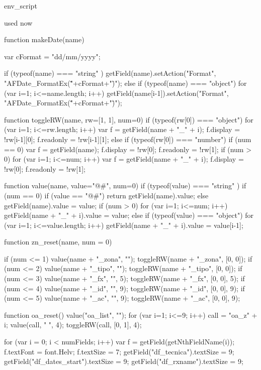 \startenvironment env_script

	 used now
		
		function makeDate(name){
			var cFormat = "dd/mm/yyyy";

			if (typeof(name) === "string" ) {	
				getField(name).setAction("Format", "AFDate_FormatEx(\""+cFormat+"\")");
			}
			else if (typeof(name) === "object") {	
				for (var i=1; i<=name.length; i++) {
					getField(name[i-1]).setAction("Format", "AFDate_FormatEx(\""+cFormat+"\")");
				} 
			}

		}

		function toggleRW(name, rw=[1, 1], num=0){ 
			if (typeof(rw[0]) === "object") {
				for (var i=1; i<=rw.length; i++) {
					var f = getField(name + "_" + i); 
					f.display =  !rw[i-1][0]; 
					f.readonly = !rw[i-1][1]; 
				} 
			}	
			else if (typeof(rw[0]) === "number") {
				if (num == 0) {
					var f = getField(name); 
					f.display =  !rw[0]; 
					f.readonly = !rw[1]; 
				}
				if (num > 0) {
					for (var i=1; i<=num; i++) {
						var f = getField(name + "_" + i); 
						f.display  = !rw[0]; 
						f.readonly = !rw[1];
					} 
				}
			}
		}

		function value(name, value="@#", num=0){ 
			if (typeof(value) === "string" ) {	
				if (num == 0) {
					if (value == "@#") { 
						return getField(name).value; 
					} 
					else { 
						getField(name).value = value; 
					}
				}
				if (num > 0){
					for (var i=1; i<=num; i++) {
						getField(name + "_" + i).value = value; 
					} 
				}
			}
			else if (typeof(value) === "object") {	
				for (var i=1; i<=value.length; i++) {
					getField(name + "_" + i).value = value[i-1]; 
				} 
			}
		}

		function zn_reset(name, num = 0){

			if (num <= 1){ value(name + "_zona", "");  toggleRW(name + "_zona", [0, 0]);  }
			if (num <= 2){ value(name + "_tipo", "");  toggleRW(name + "_tipo", [0, 0]);  }
			if (num <= 3){ value(name + "_fx", "", 5); toggleRW(name + "_fx", [0, 0], 5); } 
			if (num <= 4){ value(name + "_id", "", 9); toggleRW(name + "_id", [0, 0], 9); }
			if (num <= 5){ value(name + "_ac", "", 9); toggleRW(name + "_ac", [0, 0], 9); }
		}

		function oa_reset(){
			value("oa_list", "");
			for (var i=1; i<=9; i++) {
				call = "oa_z" + i;
				value(call, " ", 4);
				toggleRW(call, [0, 1], 4); 	
			}
		}


		for (var i = 0; i < numFields; i++) { var f = getField(getNthFieldName(i));  f.textFont = font.Helv;  f.textSize = 7; }
		getField("df_tecnica").textSize = 9; getField("df_dates_start").textSize = 9; getField("df_rxname").textSize = 9;


